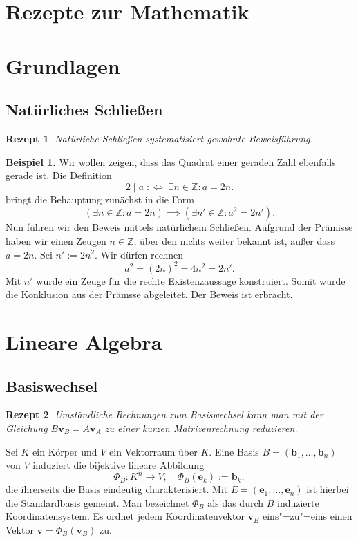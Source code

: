 \documentclass[a4paper,10pt,fleqn,twocolumn,twoside,dvipdfmx]{scrartcl}
\theoremstyle{rmbox}
\newtheorem{Rezept}{Rezept}[section]
\newcommand{\strong}[1]{\textsf{\textbf{#1}}}
\newcommand{\bv}[1]{\mathbf{#1}}
\newcommand{\Z}{\mathbb Z}
\newcommand{\defiff}{\;:\Longleftrightarrow\;}
\begin{document}
\section*{\LARGE Rezepte zur Mathematik}

\tableofcontents

\clearpage
\section{Grundlagen}

\subsection{Natürliches Schließen}

\begin{Rezept}
Natürliche Schließen systematisiert gewohnte Beweisführung.
\end{Rezept}
\strong{Beispiel 1.}
Wir wollen zeigen, dass das Quadrat einer geraden Zahl ebenfalls
gerade ist. Die Definition
\[2\mid a \defiff \exists n\in\Z\colon a = 2n.\]
bringt die Behauptung zunächst in die Form
\[(\exists n\in\Z\colon a = 2n) \implies (\exists n'\in\Z\colon a^2 = 2n').\]
Nun führen wir den Beweis mittels natürlichem Schließen. Aufgrund
der Prämisse haben wir einen Zeugen $n\in\Z$, über den nichts
weiter bekannt ist, außer dass $a=2n$. Sei $n':=2n^2$. Wir dürfen
rechnen
\[a^2 = (2n)^2 = 4n^2 = 2n'.\]
Mit $n'$ wurde ein Zeuge für die rechte Existenzaussage konstruiert.
Somit wurde die Konklusion aus der Prämsse abgeleitet. Der Beweis
ist erbracht.

\section{Lineare Algebra}

\subsection{Basiswechsel}

\begin{Rezept}
Umständliche Rechnungen zum Basiswechsel kann man mit der
Gleichung $B\bv v_B = A\bv v_A$ zu einer kurzen Matrizenrechnung
reduzieren.
\end{Rezept}

\noindent
Sei $K$ ein Körper und $V$ ein Vektorraum über $K$.
Eine Basis $B=(\bv b_1,\ldots, \bv b_n)$ von $V$ induziert die
bijektive lineare Abbildung
\[\Phi_B\colon K^n\to V,\quad \Phi_B(\bv e_k) := \bv b_k,\]
die ihrerseits die Basis eindeutig charakterisiert. Mit
$E=(\bv e_1,\ldots,\bv e_n)$ ist hierbei die Standardbasis gemeint.
Man bezeichnet $\Phi_B$ als das durch $B$ induzierte Koordinatensystem.
Es ordnet jedem Koordinatenvektor $\bv v_B$ eins"=zu"=eins einen Vektor
$\bv v = \Phi_B(\bv v_B)$ zu.
\end{document}
